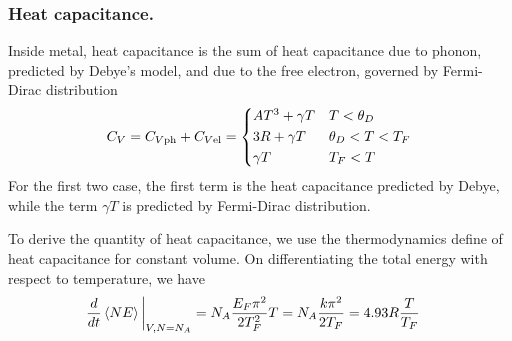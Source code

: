 \documentclass[../../../Main.tex]{subfiles}
\begin{document}
\subsubsection*{Heat capacitance.} Inside metal, heat capacitance is the sum of heat capacitance due to phonon, predicted by Debye's model, and due to the free electron, governed by Fermi-Dirac distribution 
\begin{equation*}
    C_V=C_{V\text{ph}}+C_{V\text{el}}=\begin{cases*}
        AT^3+\gamma T &$T<\theta_D$\\
        3R+\gamma T & $\theta_D<T<T_F$\\
        \gamma T &$T_F<T$
    \end{cases*}
\end{equation*}
For the first two case, the first term is the heat capacitance predicted by Debye, while the term $\gamma T$ is predicted by Fermi-Dirac distribution.

To derive the quantity of heat capacitance, we use the thermodynamics define of heat capacitance for constant volume. On differentiating the total energy with respect to temperature, we have 
\begin{align*}
    \frac{d}{dt}\braket{NE}\bigg|_{V,N=N_A}&=N_A \frac{E_F\pi^2}{2T_F^2}T=N_A\frac{k\pi^2}{2T_F}=4.93R\frac{T}{T_F}
\end{align*}
\end{document}
